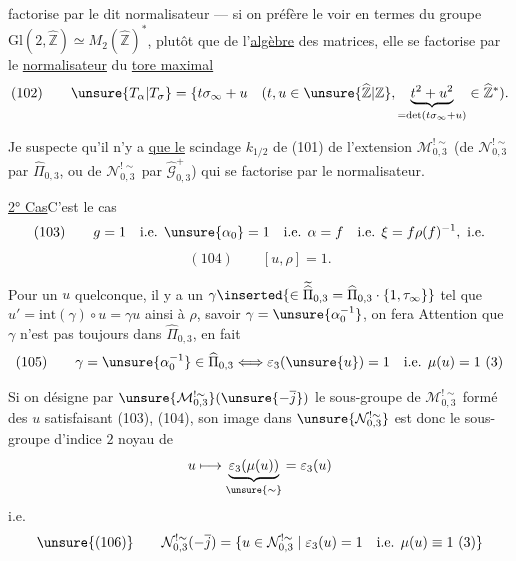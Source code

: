 
factorise par le dit normalisateur --- si on préfère le voir en termes du
groupe $\mathrm{Gl}(2,\widehat{\mathbb Z})\simeq M_2(\widehat{\mathbb Z})^*$,
plutôt que de l'\uline{algèbre} des matrices, elle se factorise par
le \uline{normalisateur} du \uline{tore maximal}
\[
 (102)\qquad
 \unsure{T_\alpha|T_\sigma}=
 \{t\sigma_\infty+u\quad
 (t,u\in\unsure{\widehat{\mathbb Z}|\mathbb Z},
 \underbrace{t^2+u^2}_{=\det(t\sigma_\infty+u)}
 \in\widehat{\mathbb Z}^{*}).
\]

Je suspecte qu'il n'y a \uline{que le} scindage $k_{1/2}$ de (101)
de l'extension $\mathcal M_{0,3}^{!\sim}$
(de $\mathcal N_{0,3}^{!\sim}$ par $\widehat{\Pi}_{0,3}$,
 ou de $\mathcal N_{0,3}^{!\sim}$
par $\widehat{\mathcal G}_{0,3}^{+}$)
qui se factorise par le normalisateur.


\uline{2° Cas}\quad C'est le cas
\[
 (103)\qquad
 g=1\quad\text{i.e. }\unsure{\alpha_0}=1
 \quad\text{i.e. }\alpha=f
 \quad\text{i.e. }\xi=f\rho(f)^{-1},\ \text{i.e.}
\]
\[
 (104)\qquad [u,\rho]=1.
\]

Pour un $u$ quelconque, il y a un
$\gamma\inserted{\in\widetilde{\widehat{\Pi}}_{0,3}
=\widehat{\Pi}_{0,3}\cdot\{1,\tau_\infty\}}$
 tel que
$u'=\mathrm{int}(\gamma)\circ u=\gamma u$
 ainsi à $\rho$,
savoir $\gamma=\unsure{\alpha_0^{-1}}$,
 on fera Attention que
$\gamma$ n'est pas toujours dans $\widehat{\Pi}_{0,3}$, en fait
\[
 (105)\qquad
 \gamma=\unsure{\alpha_0^{-1}}\in\widehat{\Pi}_{0,3}
 \Longleftrightarrow
 \varepsilon_3(\unsure{u})=1
 \quad\text{i.e. }\mu(u)=1\ (3)
\]


Si on désigne par
$\unsure{\mathcal M_{0,3}^{!\sim}}(\unsure{-\overline{j}})$
le sous-groupe de $\mathcal M_{0,3}^{!\sim}$
formé des $u$ satisfaisant (103), (104), son image dans
$\unsure{\mathcal N_{0,3}^{!\sim}}$ est donc
le sous-groupe d'indice $2$ noyau de
\[
 u\longmapsto
 \underbrace{\varepsilon_3(\mu(u))}_{\unsure{\sim}}
 =\varepsilon_3(u)
\]
i.e.
\[
 \unsure{(106)}\qquad
 \mathcal N_{0,3}^{!\sim}(-\overline{j})
 =\{u\in\mathcal N_{0,3}^{!\sim}\mid
 \varepsilon_3(u)=1\quad
 \text{i.e. }\mu(u)\equiv1\ (3)\}
\]

